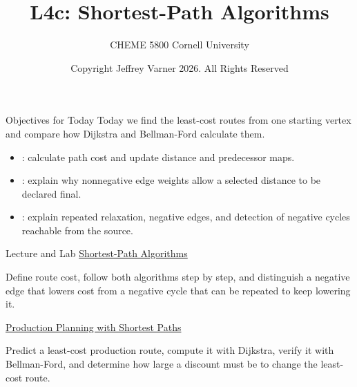 \documentclass[aspectratio=169,11pt]{beamer}
\title{{\vnheavy L4c}: Shortest-Path Algorithms}
\subtitle{CHEME 5800 Cornell University}
\author{Copyright Jeffrey Varner 2026. All Rights Reserved}
\begin{document}
\vntitlepage

\begin{frame}{Objectives for Today}
  Today we find the least-cost routes from one starting vertex and compare
  how Dijkstra and Bellman-Ford calculate them.

  \vspace{0.9em}
  {\large\textbf{}}
  \vspace{0.4em}
  \begin{itemize}\setlength{\itemsep}{0.7em}
    \item {}: calculate path cost and update
      distance and predecessor maps.
    \item {}: explain why nonnegative edge weights
      allow a selected distance to be declared final.
    \item {}: explain repeated relaxation, negative edges,
      and detection of negative cycles reachable from the source.
  \end{itemize}

\end{frame}

\begin{frame}{Lecture and Lab}
  \textbf{}
  \href{https://github.com/varnerlab/CHEME-5800-CourseRepository-Fall-2026/blob/main/weeks/week-04/L4c/CHEME-5800-L4c-Lecture-ShortestPathAlgorithms-Fall-2026.ipynb}{Shortest-Path Algorithms}

  \vspace{0.8em}
  Define route cost, follow both algorithms step by step, and distinguish a
  negative edge that lowers cost from a negative cycle that can be repeated
  to keep lowering it.

  \vspace{1.1em}
  \textbf{}
  \href{https://github.com/varnerlab/CHEME-5800-CourseRepository-Fall-2026/blob/main/weeks/week-04/L4d/CHEME-5800-L4d-Lab-ProductionPlanningShortestPath-Fall-2026.ipynb}{Production Planning with Shortest Paths}

  \vspace{0.8em}
  Predict a least-cost production route, compute it with Dijkstra, verify it
  with Bellman-Ford, and determine how large a discount must be to change the
  least-cost route.
\end{frame}
\end{document}
